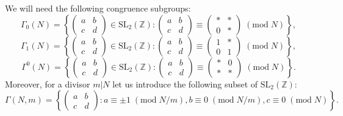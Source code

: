 \documentclass{article}
\theoremstyle{definition}
\newcommand{\ZZ} {{\mathbb Z}}		%
\begin{document}
We will need the following congruence subgroups:
\[  \Gamma_0(N) = \left\{ \begin{pmatrix} a & b \\ c & d \end{pmatrix} \in 
\mathrm{SL_2}( \ZZ) : \begin{pmatrix} a & b \\ c & d \end{pmatrix} \equiv 
\begin{pmatrix} \ast & \ast \\ 0 & \ast \end{pmatrix} \;(\mathrm{mod}\;N) \right\}, \]
\[  \Gamma_1(N) = \left\{ \begin{pmatrix} a & b \\ c & d \end{pmatrix} \in 
\mathrm{SL_2}( \ZZ) : \begin{pmatrix} a & b \\ c & d \end{pmatrix} \equiv 
\begin{pmatrix} 1 & \ast \\ 0 & 1 \end{pmatrix} \;(\mathrm{mod}\;N) \right\}, \]
\[  \Gamma^0(N) = \left\{ \begin{pmatrix} a & b \\ c & d \end{pmatrix} \in 
\mathrm{SL_2}( \ZZ) : \begin{pmatrix} a & b \\ c & d \end{pmatrix} \equiv 
\begin{pmatrix} \ast & 0 \\ \ast & \ast \end{pmatrix} \;(\mathrm{mod}\;N) \right\}. \]
Moreover, for a divisor $m|N$ let us introduce the following subset of $\mathrm{SL_2}( \ZZ)$:
\[  \Gamma(N,m) = \left\{ \begin{pmatrix} a & b \\ c & d \end{pmatrix}: 
a \equiv \pm 1 \;(\mathrm{mod}\;N/m), b \equiv 0 \;(\mathrm{mod}\;N/m), 
c \equiv 0 \;(\mathrm{mod}\;N) \right\}. \]
\end{document}
